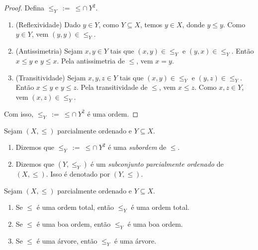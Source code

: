\begin{proof}
    Defina $\leq_Y \ := \ \leq \cap \ Y^2$.
        \begin{enumerate}[label=\roman*.]
            \item (Reflexividade) Dado $y \in Y$, como $Y \subseteq X$, temos $y \in X$, donde $y \leq y$. Como $y \in Y$, vem $(y,y) \in \leq_Y$.
            \item (Antissimetria) Sejam $x, y \in Y$ tais que $(x,y) \in \leq_Y$ e $(y,x) \in \leq_Y$. Então $x \leq y$ e $y \leq x$. Pela antissimetria de $\leq$, vem $x=y$.
            \item (Transitividade) Sejam $x, y, z \in Y$ tais que $(x,y) \in \leq_Y$ e $(y,z) \in \leq_Y$. Então $x \leq y$ e $y \leq z$. Pela transitividade de $\leq$, vem $x \leq z$. Como $x, z \in Y$, vem $(x,z) \in \leq_Y$.
        \end{enumerate}
    Com isso, $\leq_Y \ := \ \leq \cap \ Y^2$ é uma ordem. \blackproof
\end{proof}

\begin{definition}
    Sejam $(X,\leq)$ parcialmente ordenado e $Y \subseteq X$. 
        \begin{enumerate}[leftmargin=*, align=left, label=\textbf{(\alph*)}]
            \item Dizemos que $\leq_Y \ := \ \leq \cap \ Y^2$ é uma \emph{subordem} de $\leq$.
            \item Dizemos que $(Y, \leq_Y)$ é um \emph{subconjunto parcialmente ordenado} de $(X, \leq)$. Isso é denotado por $(Y, \leq)$.
        \end{enumerate}
\end{definition}

\begin{proposition}
    Sejam $(X,\leq)$ parcialmente ordenado e $Y \subseteq X$.
        \begin{enumerate}[leftmargin=*, align=left, label=\textbf{(\alph*)}]
            \item Se $\leq$ é uma ordem total, então $\leq_Y$ é uma ordem total.
            \item Se $\leq$ é uma boa ordem, então $\leq_Y$ é uma boa ordem.
            \item Se $\leq$ é uma árvore, então $\leq_Y$ é uma árvore.
        \end{enumerate}
\end{proposition}

